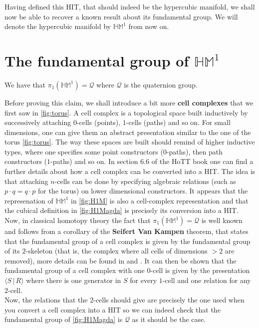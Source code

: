\documentclass{report}
\begin{document}
Having defined this HIT, that should indeed be the hypercubic manifold, we shall now be able to recover a known result about its fundamental group. We will denote the hypercubic manifold by $\mathbb{HM}^1$ from now on.
\section{The fundamental group of $\mathbb{HM}^1$}
\begin{theorem}
  We have that $\pi_1(\mathbb{HM}^1)=\mathcal{Q}$ where $\mathcal{Q}$ is the quaternion group.
\end{theorem}
Before proving this claim, we shall introduce a bit more \textbf{cell complexes} that we first saw in \ref{fig:torus}. A cell complex is a topological space built inductively by successively attaching $0$-cells (points), $1$-cells (paths) and so on. For small dimensions, one can give them an abstract presentation similar to the one of the torus \ref{fig:torus}. The way these spaces are built should remind of higher inductive types, where one specifies some point constructors ($0$-paths), then path constructors ($1$-paths) and so on. In section 6.6 of the HoTT book \cite{hott} one can find a further details about how a cell complex can be converted into a HIT. The idea is that attaching $n$-cells can be done by specifying algebraic relations (such as $p \cdot q = q \cdot p$ for the torus) on lower dimensional constructors. It appears that the represenation of $\mathbb{HM}^1$ in \ref{fig:H1M} is also a cell-complex representation and that the cubical definition in \ref{fig:H1Magda} is precisely its conversion into a HIT.\\
Now, in classical homotopy theory the fact that $\pi_1(\mathbb{HM}^1)=\mathcal{Q}$ is well known and follows from a corollary of the \textbf{Seifert Van Kampen} theorem, that states that the fundamental group of a cell complex is given by the fundamental group of its $2$-skeleton (that is, the complex where all cells of dimensions $>2$ are removed), more details can be found in \cite{hypercubic} and \cite{FundamentalCellComplex}. It can then be shown that the fundamental group of a cell complex with one $0$-cell is given by the presentation $\langle S \hspace{2pt} \vert\hspace{2pt} R \rangle$ where there is one generator in $S$ for every $1$-cell and one relation for any $2$-cell.\\
Now, the relations that the $2$-cells should give are precisely the one used when you convert a cell complex into a HIT so we can indeed check that the fundamental group of \ref{fig:H1Magda} is $\mathcal{Q}$ as it should be the case.\\
\end{document}
